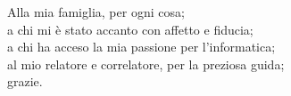 
\vspace*{\fill}

\begin{flushright}
Alla mia famiglia, per ogni cosa; \\
a chi mi è stato accanto con affetto e fiducia; \\
a chi ha acceso la mia passione per l'informatica; \\
al mio relatore e correlatore, per la preziosa guida; \\
grazie. 

\end{flushright}

\vspace*{\fill}
\clearpage